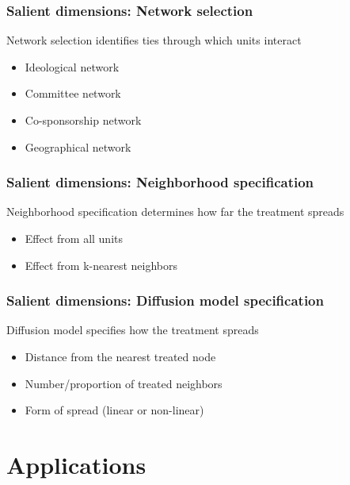 \documentclass{beamer}
\begin{document}
\begin{frame}
\frametitle{Salient dimensions: Network selection}
{\LARGE Network selection identifies ties through which units interact}
\vspace{5mm}
\begin{itemize}
\item {\Large Ideological network}
\vspace{5mm}
\item {\Large Committee network}
\vspace{5mm}
\item {\Large Co-sponsorship network}
\vspace{5mm}
\item {\Large Geographical network}
\end{itemize}
\end{frame}


\begin{frame}
\frametitle{Salient dimensions: Neighborhood specification}
{\LARGE Neighborhood specification determines how far the treatment spreads}
\vspace{5mm}
\begin{itemize}
\item {\Large Effect from all units}
\vspace{5mm}
\item {\Large Effect from k-nearest neighbors} 
\end{itemize}
\end{frame}


\begin{frame}
\frametitle{Salient dimensions: Diffusion model specification}
{\LARGE Diffusion model specifies how the treatment spreads}
\vspace{5mm}
\begin{itemize}
\item {\Large Distance from the nearest treated node}
\vspace{5mm}
\item {\Large Number/proportion of treated neighbors}
\vspace{5mm}
\item {\Large Form of spread (linear or non-linear)}
\end{itemize}
\end{frame}


\section{Applications}
\end{document}
